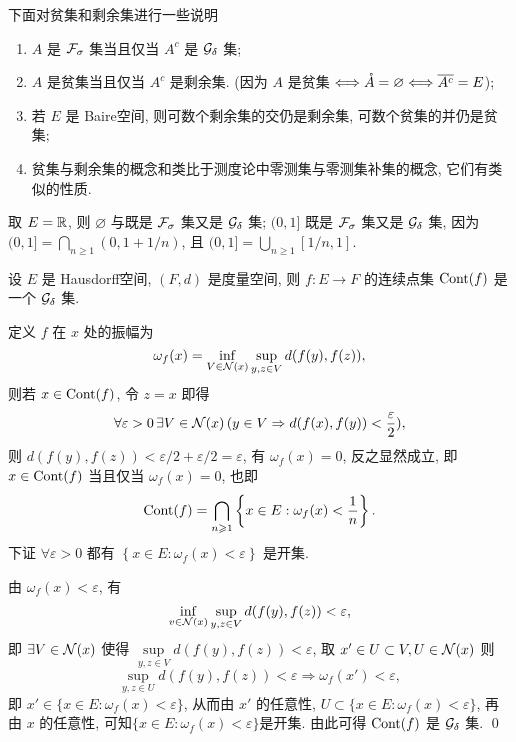 	\begin{Remark}
		下面对贫集和剩余集进行一些说明
		\begin{enumerate}[(1)]
			\item $ A $ 是 $ \CF_{\sigma} $ 集当且仅当 $ A^{c} $ 是 $ \CG_{\delta} $ 集;
			\item $ A $ 是贫集当且仅当 $ A^{c} $ 是剩余集. (因为 $ A $ 是贫集 $ \Longleftrightarrow\mathring{A}=\varnothing\Longleftrightarrow\baro{A^{c}}=E $);
			\item 若 $ E $ 是 Baire空间, 则可数个剩余集的交仍是剩余集, 可数个贫集的并仍是贫集;
			\item 贫集与剩余集的概念和类比于测度论中零测集与零测集补集的概念, 它们有类似的性质.
		\end{enumerate}
	\end{Remark}

	\begin{Example}
		取 $ E=\R $, 则 $ \varnothing $ 与\R 既是 $ \CF_{\sigma} $ 集又是 $ \CG_{\delta} $ 集; $ (0, 1] $ 既是 $ \CF_{\sigma} $ 集又是 $ \CG_{\delta} $ 集, 因为 $ (0, 1]=\bigcap_{n\geqslant1}(0, 1+1/n) $, 且 $ (0, 1]=\bigcup_{n\geqslant1}[1/n, 1] $. 
	\end{Example}

	\begin{Lemma}
		设 $ E $ 是 Hausdorff空间,  $ (F, d) $ 是度量空间, 则 $ f : E\to F $ 的连续点集 $ \cont(f) $ 是一个 $ \CG_{\delta} $ 集.
		\end{Lemma}
	\begin{Proof}
		定义 $ f $ 在 $ x $ 处的振幅为
		\[
			\omega_{f}(x)=\inf_{V\in\CN(x)}\sup_{y, z\in V}d(f(y), f(z)),
		\]
		则若 $ x\in \cont(f) $, 令 $ z=x $ 即得
		\[
			\forall\varepsilon >0\,\exists V\in\CN(x)\,(y\in V\Rightarrow d(f(x), f(y))<\frac{\varepsilon}{2}),
		\]
		则 $ d(f(y), f(z))<\varepsilon/2+\varepsilon/2=\varepsilon $, 有 $ \omega_{f}(x)=0 $, 反之显然成立, 即 $ x\in\cont(f) $ 当且仅当 $ \omega_{f}(x)=0 $, 也即
		\[
			\cont(f)=\bigcap_{n\geqslant1}\left\{ x\in E : \omega_{f}(x)<\frac{1}{n} \right\}.
		\]
		下证 $ \forall \varepsilon>0 $ 都有 $ \left\{ x\in E: \omega_{f}(x)<\varepsilon \right\} $ 是开集.

		由 $ \omega_{f}(x)<\varepsilon $, 有
		\[
			\inf_{v\in\CN(x)}\sup_{y, z\in V}d(f(y), f(z))<\varepsilon,
		\]
		即 $ \exists V\in\CN(x) $ 使得 $ \sup\limits_{y, z\in V}d(f(y), f(z))<\varepsilon $, 取 $ x'\in U\subset V, U\in \CN(x) $ 则
		\[
			\sup_{y, z\in U}d(f(y), f(z))<\varepsilon \Longrightarrow \omega_{f}(x')<\varepsilon,
		\]
		即 $ x'\in\{ x\in E : \omega_{f}(x)<\varepsilon \} $, 从而由 $ x' $ 的任意性, $ U\subset\{ x\in E : \omega_{f}(x)<\varepsilon \}  $, 再由 $ x $ 的任意性, 可知$\{ x\in E : \omega_{f}(x)<\varepsilon \}$是开集. 由此可得 $ \cont(f) $ 是 $ \CG_{\delta} $ 集. \qed
	\end{Proof}
		
